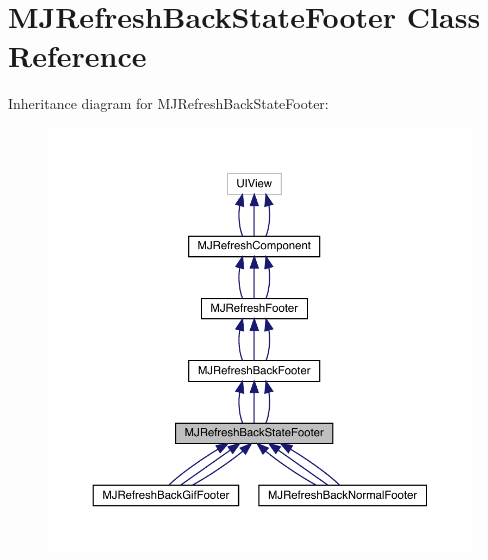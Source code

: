 \hypertarget{interface_m_j_refresh_back_state_footer}{}\section{M\+J\+Refresh\+Back\+State\+Footer Class Reference}
\label{interface_m_j_refresh_back_state_footer}


Inheritance diagram for M\+J\+Refresh\+Back\+State\+Footer\+:\nopagebreak
\begin{figure}[H]
\begin{center}
\leavevmode
\includegraphics[width=350pt]{interface_m_j_refresh_back_state_footer__inherit__graph}
\end{center}
\end{figure}


